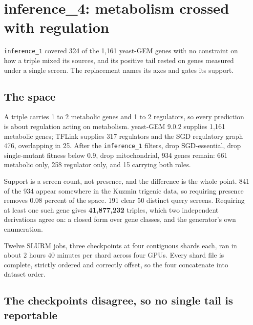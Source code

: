 
\section{inference\_4: metabolism crossed with regulation}

\texttt{inference\_1} covered 324 of the 1{,}161 yeast-GEM genes with no constraint
on how a triple mixed its sources, and its positive tail rested on genes measured
under a single screen. The replacement names its axes and gates its support.

\subsection{The space}

A triple carries 1 to 2 metabolic genes and 1 to 2 regulators, so every prediction
is about regulation acting on metabolism. yeast-GEM 9.0.2 supplies 1{,}161
metabolic genes; TFLink supplies 317 regulators and the SGD regulatory graph 476,
overlapping in 25. After the \texttt{inference\_1} filters, drop SGD-essential,
drop single-mutant fitness below 0.9, drop mitochondrial, 934 genes remain: 661
metabolic only, 258 regulator only, and 15 carrying both roles.

Support is a screen count, not presence, and the difference is the whole point.
841 of the 934 appear somewhere in the Kuzmin trigenic data, so requiring presence
removes 0.08 percent of the space. 191 clear 50 distinct query screens. Requiring
at least one such gene gives \textbf{41{,}877{,}232} triples, which two independent
derivations agree on: a closed form over gene classes, and the generator's own
enumeration.

Twelve SLURM jobs, three checkpoints at four contiguous shards each, ran in about
2 hours 40 minutes per shard across four GPUs. Every shard file is complete,
strictly ordered and correctly offset, so the four concatenate into dataset order.

\subsection{The checkpoints disagree, so no single tail is reportable}

